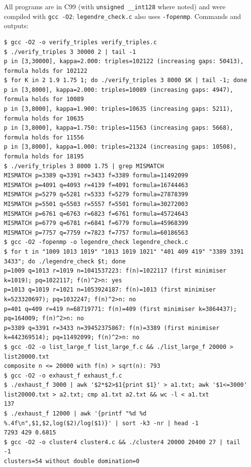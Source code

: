 \documentclass[11pt,a4paper]{article}
\theoremstyle{definition}
\begin{document}
All programs are in C99 (with \texttt{unsigned \_\_int128} where noted) and were compiled with \texttt{gcc -O2}; \texttt{legendre\_check.c} also uses \texttt{-fopenmp}. Commands and outputs:
\begin{lstlisting}[language={}]
$ gcc -O2 -o verify_triples verify_triples.c
$ ./verify_triples 3 30000 2 | tail -1
p in [3,30000], kappa=2.000: triples=102122 (increasing gaps: 50413), formula holds for 102122
$ for K in 2 1.9 1.75 1; do ./verify_triples 3 8000 $K | tail -1; done
p in [3,8000], kappa=2.000: triples=10089 (increasing gaps: 4947), formula holds for 10089
p in [3,8000], kappa=1.900: triples=10635 (increasing gaps: 5211), formula holds for 10635
p in [3,8000], kappa=1.750: triples=11563 (increasing gaps: 5668), formula holds for 11556
p in [3,8000], kappa=1.000: triples=21324 (increasing gaps: 10508), formula holds for 18195
$ ./verify_triples 3 8000 1.75 | grep MISMATCH
MISMATCH p=3389 q=3391 r=3433 f=3389 formula=11492099
MISMATCH p=4091 q=4093 r=4139 f=4091 formula=16744463
MISMATCH p=5279 q=5281 r=5333 f=5279 formula=27878399
MISMATCH p=5501 q=5503 r=5557 f=5501 formula=30272003
MISMATCH p=6761 q=6763 r=6823 f=6761 formula=45724643
MISMATCH p=6779 q=6781 r=6841 f=6779 formula=45968399
MISMATCH p=7757 q=7759 r=7823 f=7757 formula=60186563
$ gcc -O2 -fopenmp -o legendre_check legendre_check.c
$ for t in "1009 1013 1019" "1013 1019 1021" "401 409 419" "3389 3391 3433"; do ./legendre_check $t; done
p=1009 q=1013 r=1019 n=1041537223: f(n)=1022117 (first minimiser k=1019); pq=1022117; f(n)^2>n: yes
p=1013 q=1019 r=1021 n=1053924187: f(n)=1013 (first minimiser k=523320697); pq=1032247; f(n)^2>n: no
p=401 q=409 r=419 n=68719771: f(n)=409 (first minimiser k=3864437); pq=164009; f(n)^2>n: no
p=3389 q=3391 r=3433 n=39452375867: f(n)=3389 (first minimiser k=442369514); pq=11492099; f(n)^2>n: no
$ gcc -O2 -o list_large_f list_large_f.c && ./list_large_f 20000 > list20000.txt
composite n <= 20000 with f(n) > sqrt(n): 793
$ gcc -O2 -o exhaust_f exhaust_f.c
$ ./exhaust_f 3000 | awk '$2*$2>$1{print $1}' > a1.txt; awk '$1<=3000' list20000.txt > a2.txt; cmp a1.txt a2.txt && wc -l < a1.txt
137
$ ./exhaust_f 12000 | awk '{printf "%d %d %.4f\n",$1,$2,log($2)/log($1)}' | sort -k3 -nr | head -1
7293 429 0.6815
$ gcc -O2 -o cluster4 cluster4.c && ./cluster4 20000 20400 27 | tail -1
clusters=54 without double domination=0
\end{lstlisting}
\end{document}

